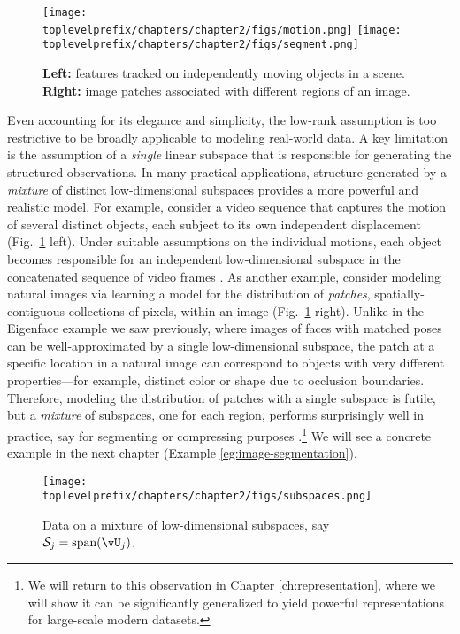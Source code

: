 \documentclass[../../book-main.tex]{subfiles}
\begin{document}
\begin{figure}
    \centering
    \texttt{[image: \\toplevelprefix/chapters/chapter2/figs/motion.png]} \hspace{5mm}
    \texttt{[image: \\toplevelprefix/chapters/chapter2/figs/segment.png]} 
    \caption{\textbf{Left:} features tracked on independently moving objects in a scene. \textbf{Right:} image patches associated with different regions of an image.}
    \label{fig:multiple-subspaces}
\end{figure}
Even accounting for its elegance and simplicity, the low-rank assumption is too restrictive to be broadly applicable to modeling real-world data. 
A key limitation is the assumption of a \textit{single} linear subspace that is responsible for generating the structured observations.
In many practical applications, structure generated by a \textit{mixture} of distinct low-dimensional subspaces provides a more
powerful and realistic model.
For example, consider a video sequence that captures the motion of several distinct objects, each subject to its own independent displacement (Fig.\ \ref{fig:multiple-subspaces} left). 
Under suitable assumptions on the individual motions, each object becomes responsible for an independent low-dimensional subspace in the concatenated sequence of video frames \cite{VidalR2004-ECCV}.
As another example, consider modeling natural images via learning a model for the distribution of \textit{patches}, spatially-contiguous collections of pixels, within an image (Fig.\ \ref{fig:multiple-subspaces} right). Unlike in the Eigenface example we saw previously, where images of faces with matched poses can be well-approximated by a single low-dimensional subspace, the patch at a specific location in a natural image can correspond to objects with very different properties---for example, distinct color or shape due to occlusion boundaries. Therefore, modeling the distribution of patches with a single subspace is futile, but a \textit{mixture} of subspaces, one for each region, performs surprisingly well in practice, say for segmenting or compressing purposes \cite{Mobahi-IJCV2011}.\footnote{We will return to this observation in Chapter \ref{ch:representation}, where we will show it can be significantly generalized to yield powerful representations for large-scale modern datasets.} We will see a concrete example in the next chapter (Example \ref{eg:image-segmentation}).



\begin{figure}
    \centering
    \texttt{[image: \\toplevelprefix/chapters/chapter2/figs/subspaces.png]}
    \caption{Data on a mixture of low-dimensional subspaces, say $\mathcal{S}_j = \mbox{span}(\vU_j)$.}
    \label{fig:subspaces}
\end{figure}
\end{document}
